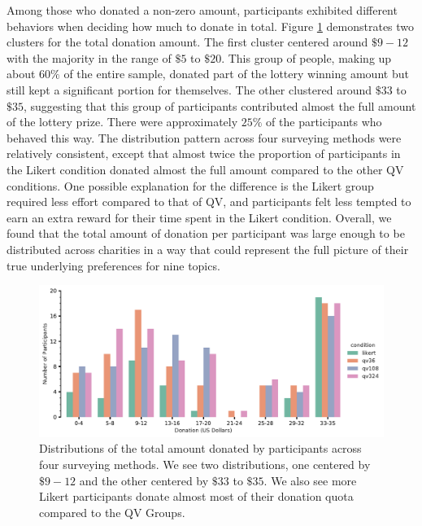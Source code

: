 Among those who donated a non-zero amount,
participants exhibited different behaviors
when deciding how much to donate in total. 
Figure \ref{fig:total_don_exp1} demonstrates
two clusters for the total donation amount. 
The first cluster centered around $\$9-12$
with the majority in the range of $\$5$ to $\$20$. 
This group of people,
making up about $60\%$ of the entire sample, 
donated part of the lottery winning amount
but still kept a significant portion for themselves.
The other clustered around $\$33$ to $\$35$, 
suggesting that this group of participants
contributed almost the full amount of the lottery prize. 
There were approximately $25\%$ of the participants who behaved this way. 
The distribution pattern across 
four surveying methods were relatively consistent, 
except that almost twice the proportion of participants 
in the Likert condition donated almost the full amount 
compared to the other QV conditions.
One possible explanation for the difference is 
the Likert group required less effort compared to that of QV, 
and participants felt less tempted 
to earn an extra reward for their time spent in the Likert condition. 
Overall, we found that the total amount of donation per participant 
was large enough to be distributed across charities
in a way that could represent the full picture of 
their true underlying preferences for nine topics.

\begin{figure}[htpb]
    \centering
    \includegraphics[width=\textwidth, keepaspectratio=true]{content/image/total_contributions_across_conditions.pdf}
    \caption{
       Distributions of the total amount donated by participants across four surveying methods.
       We see two distributions, one centered by $\$9-12$ and the other centered by $\$33$ to $\$35$.
       We also see more Likert participants donate almost most of their donation quota compared to the QV Groups.
    }
    \label{fig:total_don_exp1}
\end{figure}

